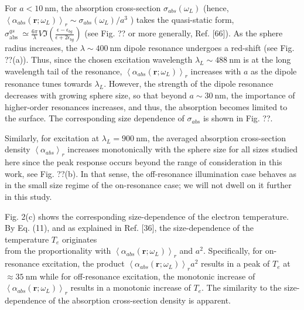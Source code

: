 \documentclass[10pt]{article}
\begin{document}
For $a<10 \mathrm{~nm}$, the absorption cross-section $\sigma_{a b s}\left(\omega_{L}\right)$ (hence, $\left\langle\alpha_{a b s}\left(\mathbf{r} ; \omega_{L}\right)\right\rangle_{r} \sim \sigma_{a b s}\left(\omega_{L}\right) / a^{3}$ ) takes the quasi-static form, $\sigma_{\text {abs }}^{q s} \simeq \frac{6 \pi}{\lambda} V \Im\left(\frac{\epsilon-\epsilon_{b g}}{\epsilon+2 \epsilon_{b g}}\right)$ (see Fig. ?? or more generally, Ref. [66]). As the sphere radius increases, the $\lambda \sim 400 \mathrm{~nm}$ dipole resonance undergoes a red-shift (see Fig. ??(a)). Thus, since the chosen excitation wavelength $\lambda_{L} \sim 488 \mathrm{~nm}$ is at the long wavelength tail of the resonance, $\left\langle\alpha_{a b s}\left(\mathbf{r} ; \omega_{L}\right)\right\rangle_{r}$ increases with $a$ as the dipole resonance tunes towards $\lambda_{L}$. However, the strength of the dipole resonance decreases with growing sphere size, so that beyond $a \sim 30 \mathrm{~nm}$, the importance of higher-order resonances increases, and thus, the absorption becomes limited to the surface. The corresponding size dependence of $\sigma_{a b s}$ is shown in Fig. ??.

Similarly, for excitation at $\lambda_{L}=900 \mathrm{~nm}$, the averaged absorption cross-section density $\left\langle\alpha_{a b s}\right\rangle_{r}$ increases monotonically with the sphere size for all sizes studied here since the peak response occurs beyond the range of consideration in this work, see Fig. ??(b). In that sense, the off-resonance illumination case behaves as in the small size regime of the on-resonance case; we will not dwell on it further in this study.

Fig. 2(c) shows the corresponding size-dependence of the electron temperature. By Eq. (11), and as explained in Ref. [36], the size-dependence of the temperature $T_{e}$ originates\\
from the proportionality with $\left\langle\alpha_{a b s}\left(\mathbf{r} ; \omega_{L}\right)\right\rangle_{r}$ and $a^{2}$. Specifically, for on-resonance excitation, the product $\left\langle\alpha_{a b s}\left(\mathbf{r} ; \omega_{L}\right)\right\rangle_{r} a^{2}$ results in a peak of $T_{e}$ at $\approx 35 \mathrm{~nm}$ while for off-resonance excitation, the monotonic increase of $\left\langle\alpha_{a b s}\left(\mathbf{r} ; \omega_{L}\right)\right\rangle_{r}$ results in a monotonic increase of $T_{e}$. The similarity to the size-dependence of the absorption cross-section density is apparent.
\end{document}
